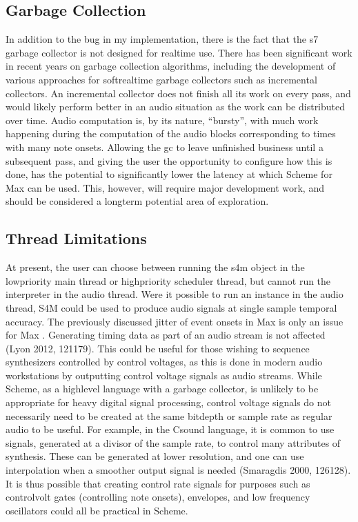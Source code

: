 \documentclass[letterpaper,10pt,english]{sphinxmanual}
\begin{document}
\subsection{Garbage Collection}
\label{\detokenize{conclusion:garbage-collection}}
\sphinxAtStartPar
In addition to the bug in my implementation, there is the fact that the s7 garbage
collector is not designed for realtime use. There has been significant work
in recent years on garbage collection algorithms, including the development
of various approaches for soft\sphinxhyphen{}realtime garbage collectors such as incremental collectors.
An incremental collector does not finish
all its work on every pass, and would likely perform better in an audio situation
as the work can be distributed over time. Audio computation is, by its nature,
“bursty”, with much work happening during the computation of the audio blocks
corresponding to times with many note onsets. Allowing the gc to leave unfinished
business until a subsequent pass, and giving the user the opportunity to configure
how this is done, has the potential to significantly lower
the latency at which Scheme for Max can be used.
This, however, will require major development work, and should be considered
a long\sphinxhyphen{}term potential area of exploration.


\subsection{Thread Limitations}
\label{\detokenize{conclusion:thread-limitations}}
\sphinxAtStartPar
At present, the user can choose between running the s4m object in the
low\sphinxhyphen{}priority main thread or high\sphinxhyphen{}priority scheduler thread, but cannot
run the interpreter in the audio thread.
Were it possible to run an instance in the audio thread, S4M could be
used to produce audio signals at single sample temporal accuracy.
The previously discussed jitter of event onsets in Max is only an issue
for Max . Generating timing data as part of an audio stream
is not affected (Lyon 2012, 121\sphinxhyphen{}179).
This could be useful for those wishing to sequence synthesizers controlled
by control voltages, as this is done in modern audio workstations by outputting
control voltage signals as audio streams.
While Scheme, as a high\sphinxhyphen{}level language with a garbage collector, is unlikely
to be appropriate for heavy digital signal processing, control voltage
signals do not necessarily need to be created at the same bit\sphinxhyphen{}depth or
sample rate as regular audio to be useful. For example, in the Csound language,
it is common to use  signals, generated at a divisor of the sample
rate, to control many attributes of synthesis. These can be generated
at lower resolution, and one can use interpolation when a smoother output
signal is needed (Smaragdis 2000, 126\sphinxhyphen{}128).
It is thus possible that creating
control rate signals for purposes such as control\sphinxhyphen{}volt gates (controlling note onsets),
envelopes, and low frequency oscillators could all be practical in Scheme.
\end{document}
